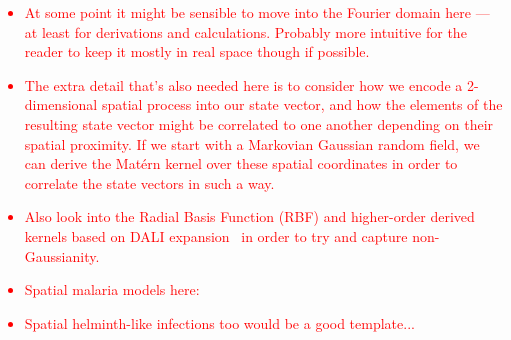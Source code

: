 \textcolor{red}{
\begin{itemize}
\item{At some point it might be sensible to move into the Fourier domain here --- at least for derivations and calculations. Probably more intuitive for the reader to keep it mostly in real space though if possible.} 
\item{The extra detail that's also needed here is to consider how we encode a 2-dimensional spatial process into our state vector, and how the elements of the resulting state vector might be correlated to one another depending on their spatial proximity. If we start with a Markovian Gaussian random field, we can derive the Mat\'{e}rn kernel over these spatial coordinates in order to correlate the state vectors in such a way.} 
\item{Also look into the Radial Basis Function (RBF) and higher-order derived kernels based on DALI expansion~\cite{sellentin2014breaking} in order to try and capture non-Gaussianity.}
\item{Spatial malaria models here:~\cite{smith2008towards,djordjevic2022stochastic}}
\item{Spatial helminth-like infections too would be a good template...}
\end{itemize}
}
